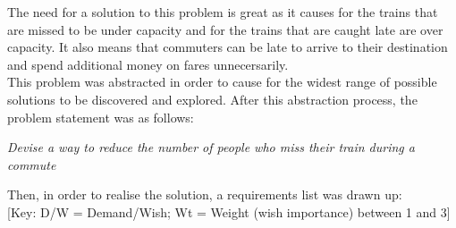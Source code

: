 \documentclass[paper=a4, fontsize=12pt]{scrartcl} %
\numberwithin{equation}{section} %
\numberwithin{figure}{section} %
\numberwithin{table}{section} %
\begin{document}
        The need for a solution to this problem is great as it causes for the trains that are missed to be under capacity and for the trains that are caught late are over capacity. It also means that commuters can be late to arrive to their destination and spend additional money on fares unnecersarily.\\

        This problem was abstracted in order to cause for the widest range of possible solutions to be discovered and explored. After this abstraction process, the problem statement was as follows:\\
        \begin{center}
            \textit{Devise a way to reduce the number of people who miss their train during a commute}\\
        \end{center}

        Then, in order to realise the solution, a requirements list was drawn up:\\

        [Key: D/W = Demand/Wish; Wt = Weight (wish importance) between 1 and 3]
\end{document}
